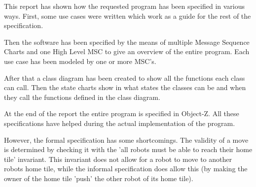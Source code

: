 This report has shown how the requested program has been specified in various ways. First, some use cases were written which work as a guide for the rest of the specification.

Then the software has been specified by the means of multiple Message Sequence Charts and one High Level MSC to give an overview of the entire program. Each use case has been modeled by one or more MSC's.

After that a class diagram has been created to show all the functions each class can call. Then the state charts show in what states the classes can be and when they call the functions defined in the class diagram.

At the end of the report the entire program is specified in Object-Z. All these specifications have helped during the actual implementation of the program.


However, the formal specification has some shortcomings. The validity of a move is determined by checking it with the 'all robots must be able to reach their home tile' invariant. This invariant does not allow for a robot to move to another robots home tile, while the informal specification does allow this (by making the owner of the home tile 'push' the other robot of its home tile).